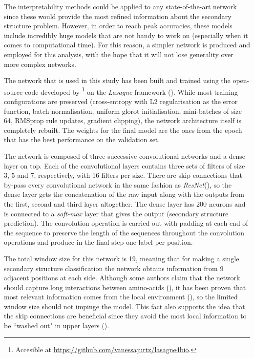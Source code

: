 The interpretability methods could be applied to any state-of-the-art network since these would provide the most refined information about the secondary structure problem. However, in order to reach peak accuracies, these models include incredibly huge models that are not handy to work on (especially when it comes to computational time). For this reason, a simpler network is produced and employed for this analysis, with the hope that it will not lose generality over more complex networks.

The network that is used in this study has been built and trained using the open-source code developed by \cite{Jurtz2017}\footnote{Accesible at \url{https://github.com/vanessajurtz/lasagne4bio}.} on the \textit{Lasagne} framework (\cite{Dieleman2015}). While most training configurations are preserved (cross-entropy with L2 regularisation as the error function, batch normalisation, uniform glorot initialisation, mini-batches of size 64, RMSprop rule updates, gradient clipping), the network architecture itself is completely rebuilt. The weights for the final model are the ones from the epoch that has the best performance on the validation set.

The network is composed of three successive convolutional networks and a dense layer on top. Each of the convolutional layers contains three sets of filters of size 3, 5 and 7, respectively, with 16 filters per size. There are skip connections that by-pass every convolutional network in the same fashion as \textit{ResNet}(\cite{He2015}), so the dense layer gets the concatenation of the raw input along with the outputs from the first, second and third layer altogether.
The dense layer has 200 neurons and is connected to a \textit{soft-max} layer that gives the output (secondary structure prediction). The convolution operation is carried out with padding at each end of the sequence to preserve the length of the sequences throughout the convolution operations and produce in the final step one label per position.


The total window size for this network is 19, meaning that for making a single secondary structure classification the network obtains information from 9 adjacent positions at each side. Although some authors claim that the network should capture long interactions between amino-acids (\cite{Li2016,Lin2016,Hattori2017,Heffernan2017}), it has been proven that most relevant information comes from the local environment (\cite{Busia2017}), so the limited window size should not impinge the model. This fact also supports the idea that the skip connections are beneficial since they avoid the most local information to be ``washed out" in upper layers (\cite{Busia2017}).

